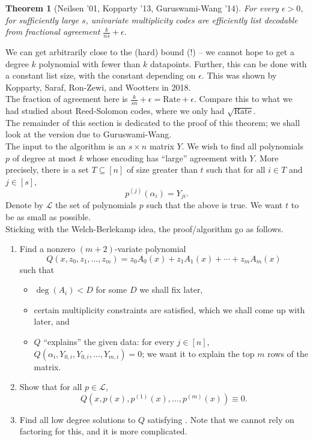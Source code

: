 \documentclass{article}
\newcounter{lecnum}
\newtheorem{theorem}{Theorem}[lecnum]
\begin{document}
	\begin{theorem}[Neilsen '01, Kopparty '13, Guruswami-Wang '14]
		For every $\epsilon > 0$, for sufficiently large $s$, univariate multiplicity codes are efficiently list decodable from fractional agreement $\frac{k}{ns} + \epsilon$.
	\end{theorem}
	We can get arbitrarily close to the (hard) bound (!) -- we cannot hope to get a degree $k$ polynomial with fewer than $k$ datapoints. Further, this can be done with a constant list size, with the constant depending on $\epsilon$. This was shown by Kopparty, Saraf, Ron-Zewi, and Wootters in 2018. \\
	The fraction of agreement here is $\frac{k}{sn} + \epsilon = \text{Rate} + \epsilon$. Compare this to what we had studied about Reed-Solomon codes, where we only had $\sqrt{\text{Rate}}$.\\

	The remainder of this section is dedicated to the proof of this theorem; we shall look at the version due to Guruswami-Wang.\\

	The input to the algorithm is an $s \times n$ matrix $Y$. We wish to find all polynomials $p$ of degree at most $k$ whose encoding has ``large'' agreement with $Y$. More precisely, there is a set $T \subseteq [n]$ of size greater than $t$ such that for all $i \in T$ and $j \in [s]$,
	\[ p^{(j)}(\alpha_{i}) = Y_{ji}. \]
	Denote by $\mathcal{L}$ the set of polynomials $p$ such that the above is true.
	We want $t$ to be as small as possible.\\
	Sticking with the Welch-Berlekamp idea, the proof/algorithm go as follows.
	\begin{enumerate}
		\item Find a nonzero $(m+2)$-variate polynomial
		\[ Q(x,z_0,z_1,\ldots,z_m) = z_0 A_0(x) + z_1 A_1(x) + \cdots + z_m A_m(x) \]
		such that
		\begin{itemize}
			\item $\deg(A_i) < D$ for some $D$ we shall fix later,
			\item certain multiplicity constraints are satisfied, which we shall come up with later, and
			\item $Q$ ``explains'' the given data: for every $j \in [n]$, $Q(\alpha_i,Y_{0,i},Y_{0,i},\ldots,Y_{m,i}) = 0$; we want it to explain the top $m$ rows of the matrix.
		\end{itemize}
		\item Show that for all $p \in \mathcal{L}$,
		\begin{equation}
			\label{eqn: guruswami-wang}
			Q(x,p(x),p^{(1)}(x),\ldots,p^{(m)}(x)) \equiv 0.
		\end{equation}
		\item Find all low degree solutions to $Q$ satisfying . Note that we cannot rely on factoring for this, and it is more complicated.
	\end{enumerate}
\end{document}
